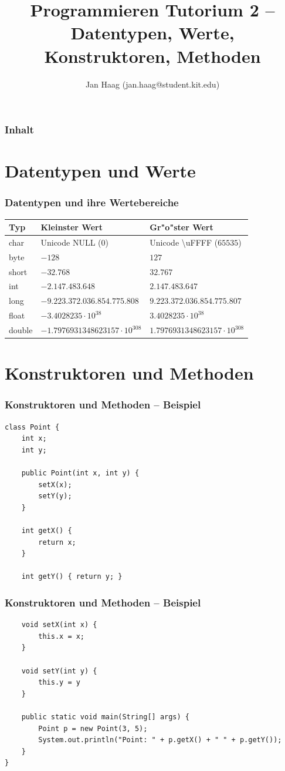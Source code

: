 \documentclass{beamer}
\author{Jan Haag (jan.haag@student.kit.edu)}
\title{Programmieren Tutorium 2 -- Datentypen, Werte, Konstruktoren, Methoden}
\institute{Institut f\"{u}r Zeritfizierbare und Vertrauensw\"{u}rdige Informatiksysteme (ZVI)}
\begin{document}
\begin{frame}
\maketitle
\end{frame}

\begin{frame}
\frametitle{Inhalt}
\tableofcontents
\end{frame}

\section{Datentypen und Werte}
\begin{frame}%
\frametitle{Datentypen und ihre Wertebereiche}
\begin{tabular}{lll}
Typ & Kleinster Wert & Gr"o"ster Wert\\
\hline
char & Unicode NULL ($0$) & Unicode \textbackslash{}uFFFF ($65 535$) \\
byte & $-128$ & $127$ \\
short & $-32.768$ & $32.767$ \\
int & $-2.147.483.648$ & $2.147.483.647$ \\
long & $-9.223.372.036.854.775.808$ & $9.223.372.036.854.775.807$\\
float & $-3.4028235\cdot{}10^{38}$ & $3.4028235\cdot{}10^{38}$\\
double & $-1.7976931348623157\cdot{}10^{308}$ & $1.7976931348623157\cdot{}10^{308}$\\
\end{tabular}
\end{frame}

\section{Konstruktoren und Methoden}
\begin{frame}[fragile]
\frametitle{Konstruktoren und Methoden -- Beispiel}
\begin{verbatim}
class Point {
    int x;
    int y;

    public Point(int x, int y) {
        setX(x);
        setY(y);
    }

    int getX() {
        return x;
    }

    int getY() { return y; }
\end{verbatim}
\end{frame}

\begin{frame}[fragile]
\frametitle{Konstruktoren und Methoden -- Beispiel}
\begin{verbatim}
    void setX(int x) {
        this.x = x;
    }

    void setY(int y) {
        this.y = y
    }

    public static void main(String[] args) {
        Point p = new Point(3, 5);
        System.out.println("Point: " + p.getX() + " " + p.getY());
    }
}
\end{verbatim}
\end{frame}
\end{document}
